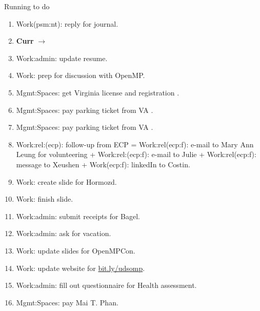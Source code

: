 
\begin{frame}{Running to do}
\begin{enumerate}
  \item \tiny Work(psm:nt): reply for journal.
  

    \tiny \item[] \tiny \textbf{Curr} $\rightarrow$ 
         \item \tiny Work:admin: update resume.
 
    \item \tiny Work: prep for discussion with OpenMP. 
    
	\item \tiny Mgmt:Spaces: get Virginia license and registration .
    \item \tiny Mgmt:Spaces: pay parking ticket from VA  . 
    \item \tiny Mgmt:Spaces: pay parking ticket from VA  .  
\item \tiny Work:rel:(ecp): follow-up from ECP  = Work:rel(ecp:f):
  e-mail to Mary Ann Leung for volunteering + Work:rel:(ecp:f): e-mail
  to Julie + Work:rel(ecp:f): message to Xeushen + Work(ecp:f): linkedIn to Costin.  

\item \tiny Work: create slide for Hormozd.

   \item \tiny Work: finish slide. 
  \item \tiny Work:admin: submit receipts for Bagel.
  \item \tiny Work:admin: ask for vacation.      
    \item \tiny Work: update slides for OpenMPCon. 
    \item \tiny Work: update website for  \url{bit.ly/udsomp}. 
    \item \tiny Work:admin: fill out questionnaire for Health assessment.
    \item \tiny Mgmt:Spaces: pay Mai T. Phan. 
\seti
\end{enumerate}
  
\end{frame}
  
